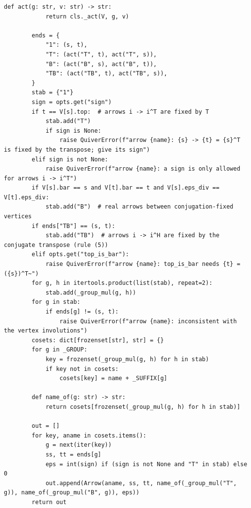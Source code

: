 \documentclass[12pt, a4paper]{report}
\theoremstyle{plain}
\theoremstyle{definition}
\theoremstyle{remark}
\theoremstyle{plain}
\begin{document}
\begin{lstlisting}[style=dsqcode]
        def act(g: str, v: str) -> str:
            return cls._act(V, g, v)

        ends = {
            "1": (s, t),
            "T": (act("T", t), act("T", s)),
            "B": (act("B", s), act("B", t)),
            "TB": (act("TB", t), act("TB", s)),
        }
        stab = {"1"}
        sign = opts.get("sign")
        if t == V[s].top:  # arrows i -> i^T are fixed by T
            stab.add("T")
            if sign is None:
                raise QuiverError(f"arrow {name}: {s} -> {t} = {s}^T is fixed by the transpose; give its sign")
        elif sign is not None:
            raise QuiverError(f"arrow {name}: a sign is only allowed for arrows i -> i^T")
        if V[s].bar == s and V[t].bar == t and V[s].eps_div == V[t].eps_div:
            stab.add("B")  # real arrows between conjugation-fixed vertices
        if ends["TB"] == (s, t):
            stab.add("TB")  # arrows i -> i^H are fixed by the conjugate transpose (rule (5))
        elif opts.get("top_is_bar"):
            raise QuiverError(f"arrow {name}: top_is_bar needs {t} = ({s})^T~")
        for g, h in itertools.product(list(stab), repeat=2):
            stab.add(_group_mul(g, h))
        for g in stab:
            if ends[g] != (s, t):
                raise QuiverError(f"arrow {name}: inconsistent with the vertex involutions")
        cosets: dict[frozenset[str], str] = {}
        for g in _GROUP:
            key = frozenset(_group_mul(g, h) for h in stab)
            if key not in cosets:
                cosets[key] = name + _SUFFIX[g]

        def name_of(g: str) -> str:
            return cosets[frozenset(_group_mul(g, h) for h in stab)]

        out = []
        for key, aname in cosets.items():
            g = next(iter(key))
            ss, tt = ends[g]
            eps = int(sign) if (sign is not None and "T" in stab) else 0
            out.append(Arrow(aname, ss, tt, name_of(_group_mul("T", g)), name_of(_group_mul("B", g)), eps))
        return out


\end{lstlisting}
\end{document}
